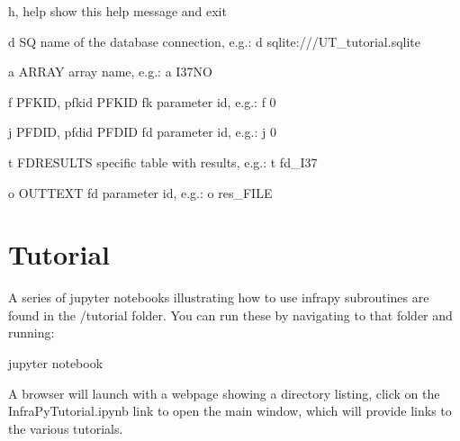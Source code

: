 \documentclass[letterpaper,10pt,english]{sphinxmanual}
\begin{document}
\begin{DUlineblock}{0em}
\item[] \sphinxhyphen{}h, \textendash{}help            show this help message and exit
\item[] \sphinxhyphen{}d SQ                 name of the database connection, e.g.: \sphinxhyphen{}d sqlite:///UT\_tutorial.sqlite
\item[] \sphinxhyphen{}a ARRAY              array name, e.g.: \sphinxhyphen{}a I37NO
\item[] \sphinxhyphen{}f PFKID, \textendash{}pfkid PFKID fk parameter id, e.g.: \sphinxhyphen{}f 0
\item[] \sphinxhyphen{}j PFDID, \textendash{}pfdid PFDID fd parameter id, e.g.: \sphinxhyphen{}j 0
\item[] \sphinxhyphen{}t FDRESULTS          specific table with results, e.g.: \sphinxhyphen{}t fd\_I37
\item[] \sphinxhyphen{}o OUTTEXT            fd parameter id, e.g.: \sphinxhyphen{}o res\_FILE
\end{DUlineblock}

\begin{sphinxVerbatim}[commandchars=\\\{\}]
  \PYG{p}{[}\PYG{p}{]}         \PYG{p}{[} \PYG{p}{]} \PYG{p}{[} \PYG{p}{]}
\end{sphinxVerbatim}


\section{Tutorial}
\label{\detokenize{tutorial:tutorial}}\label{\detokenize{tutorial:id1}}\label{\detokenize{tutorial::doc}}
A series of jupyter notebooks illustrating how to use infrapy subroutines are found in the /tutorial folder.
You can run these by navigating to that folder and running:

\begin{sphinxVerbatim}[commandchars=\\\{\}]
\PYGZgt{}\PYGZgt{} jupyter notebook
\end{sphinxVerbatim}

A browser will launch with a webpage showing a directory listing, click on the InfraPyTutorial.ipynb link to open the main window, which will provide links to the various tutorials.
\end{document}
